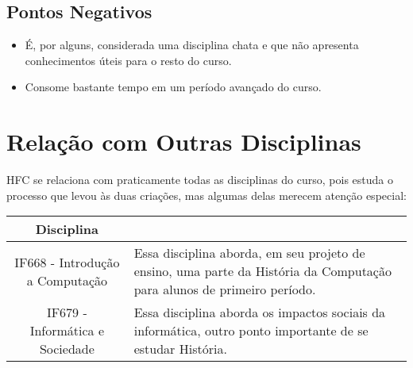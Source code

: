 \documentclass{article}
\begin{document}
\subsection{Pontos Negativos}

\begin{itemize}
    \item É, por alguns, considerada uma disciplina chata e que não apresenta conhecimentos úteis para o resto do curso.
    \item Consome bastante tempo em um período avançado do curso.
    
\end{itemize}

\section{Relação com Outras Disciplinas}

HFC se relaciona com praticamente todas as disciplinas do curso, pois estuda o processo que levou às duas criações, mas algumas delas merecem atenção especial:

\begin{table}[h]
    \centering
    \begin{tabular}{||c|m{8.5cm}||}
    \hline
     Disciplina & \\
     \hline
     IF668 - Introdução a Computação & Essa disciplina aborda, em seu projeto de ensino, uma parte da História da Computação para alunos de primeiro período. \cite{cinwikiif668}\\
     \hline
     IF679 - Informática e Sociedade & Essa disciplina aborda os impactos sociais da informática, outro ponto importante de se estudar História. \cite{cinwikiif679}\\
     \hline
     
     
        
    \end{tabular}
    
    
    \label{tab:relacoes}
\end{table}



\nocite{*}
\end{document}
